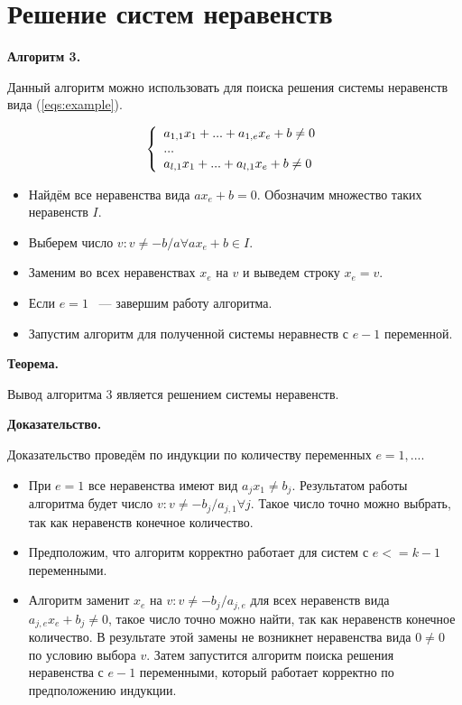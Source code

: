 \documentclass[14pt]{mmcs-article}
\begin{document}
\newpage

\section{Решение систем неравенств}

\textbf{Алгоритм 3.}

Данный алгоритм можно использовать для поиска решения системы неравенств вида (\ref{eqs:example}).

\begin{equation}
    \centering
    \left\{
        \begin{array}{ll}
            a_{1,1} x_1 + ... + a_{1,e} x_e + b \neq 0\\
            ...\\
            a_{l,1} x_1 + ... + a_{l,1} x_e + b \neq 0\\
        \end{array}
    \right.
    \label{eqs:example}
\end{equation}

\begin{itemize}
    \item Найдём все неравенства  вида $a x_e + b = 0$. Обозначим множество таких неравенств $I$.
    \item Выберем число $v: v \neq -b/a \forall a x_e + b \in I$.
    \item Заменим во всех неравенствах $x_e$ на $v$ и выведем строку $x_e = v$.
    \item Если $e = 1$ ~--- завершим работу алгоритма.
    \item Запустим алгоритм для полученной системы неравнеств с $e - 1$ переменной.
\end{itemize}

\textbf{Теорема.}

Вывод алгоритма 3 является решением системы неравенств.

\textbf{Доказательство.}

Доказательство проведём по индукции по количеству переменных $e = 1, ...$.

\begin{itemize}
\item При $e = 1$ все неравенства имеют вид $a_j x_1 \neq b_j$. Результатом работы алгоритма будет число $v: v \neq -b_{j}/a_{j, 1} \forall j$. Такое число точно можно выбрать, так как неравенств конечное количество.
\item Предположим, что алгоритм корректно работает для систем с $e <= k - 1$ переменными.
\item Алгоритм заменит $x_e$ на $v: v \neq -b_{j}/a_{j, e}$ для всех неравенств вида $a_{j, e} x_e + b_j \neq 0$, такое число точно можно найти, так как неравенств конечное количество. В результате этой замены не возникнет неравенства вида $0 \neq 0$ по условию выбора $v$. Затем запустится алгоритм поиска решения неравенства с $e - 1$ переменными, который работает корректно по предположению индукции. 
\end{itemize}
\end{document}
